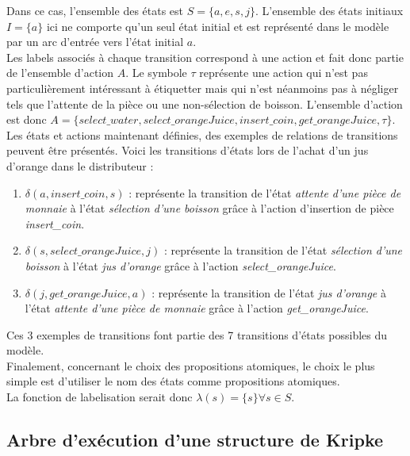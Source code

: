 \documentclass[runningheads,a4paper,10pt]{llncs}
\begin{document}
\noindent
Dans ce cas, l'ensemble des états est $S = \{a, e, s, j\}$. L'ensemble des états initiaux $I = \{a\}$ ici ne comporte qu'un seul état initial et est représenté dans le modèle par un arc d'entrée vers l'état initial $a$. \\

\noindent
Les labels associés à chaque transition correspond à une action et fait donc partie de l'ensemble d'action $A$. Le symbole $\tau$ représente une action qui n'est pas particulièrement intéressant à étiquetter mais qui n'est néanmoins pas à négliger tels que l'attente de la pièce ou une non-sélection de boisson. L'ensemble d'action est donc $A = \{select\_water, select\_orangeJuice, insert\_coin, get\_orangeJuice, \tau\}$. \\

\noindent
Les états et actions maintenant définies, des exemples de relations de transitions peuvent être présentés. Voici les transitions d'états lors de l'achat d'un jus d'orange dans le distributeur : 

\begin{enumerate}
\item \boldmath$\delta(a,insert\_coin,s)$ : représente la transition de l'état \textit{attente d'une pièce de monnaie} à l'état \textit{sélection d'une boisson} grâce à l'action d'insertion de pièce \textit{insert\_coin}. 
\item \boldmath$\delta(s,select\_orangeJuice,j)$ : représente la transition de l'état \textit{sélection d'une boisson} à l'état \textit{jus d'orange} grâce à l'action \textit{select\_orangeJuice}. 
\item \boldmath$\delta(j,get\_orangeJuice,a)$ : représente la transition de l'état \textit{jus d'orange} à l'état \textit{attente d'une pièce de monnaie} grâce à l'action \textit{get\_orangeJuice}.
\end{enumerate} 

Ces 3 exemples de transitions font partie des 7 transitions d'états possibles du modèle. \\

\noindent
Finalement, concernant le choix des propositions atomiques, le choix le plus simple est d'utiliser le nom des états comme propositions atomiques.\\
La fonction de labelisation serait donc $\lambda(s) = \{s\}  \forall s \in S$.  

\subsection{Arbre d'exécution d'une structure de Kripke}
\end{document}
